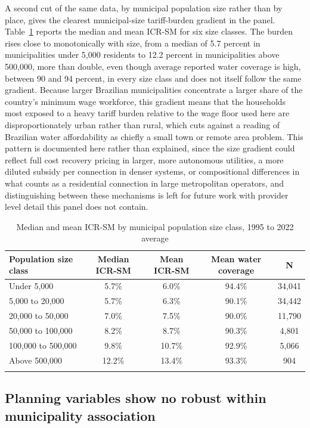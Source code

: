 \documentclass[pdflatex,sn-mathphys-num]{sn-jnl}%
\theoremstyle{thmstyleone}%
\theoremstyle{thmstyletwo}%
\theoremstyle{thmstylethree}%
\begin{document}
A second cut of the same data, by municipal population size rather than by place, gives the clearest municipal-size tariff-burden gradient in the panel. Table~\ref{tab_icr_porte} reports the median and mean ICR-SM for six size classes. The burden rises close to monotonically with size, from a median of 5.7 percent in municipalities under 5,000 residents to 12.2 percent in municipalities above 500,000, more than double, even though average reported water coverage is high, between 90 and 94 percent, in every size class and does not itself follow the same gradient. Because larger Brazilian municipalities concentrate a larger share of the country's minimum wage workforce, this gradient means that the households most exposed to a heavy tariff burden relative to the wage floor used here are disproportionately urban rather than rural, which cuts against a reading of Brazilian water affordability as chiefly a small town or remote area problem. This pattern is documented here rather than explained, since the size gradient could reflect full cost recovery pricing in larger, more autonomous utilities, a more diluted subsidy per connection in denser systems, or compositional differences in what counts as a residential connection in large metropolitan operators, and distinguishing between these mechanisms is left for future work with provider level detail this panel does not contain.

\begin{table}[h]
\caption{Median and mean ICR-SM by municipal population size class, 1995 to 2022 average}\label{tab_icr_porte}
\begin{tabular}{@{}lcccc@{}}
\toprule
Population size class & Median ICR-SM & Mean ICR-SM & Mean water coverage & N \\
\midrule
Under 5,000            & 5.7\% & 6.0\%  & 94.4\% & 34,041 \\
5,000 to 20,000        & 5.7\% & 6.3\%  & 90.1\% & 34,442 \\
20,000 to 50,000       & 7.0\% & 7.5\%  & 90.0\% & 11,790 \\
50,000 to 100,000      & 8.2\% & 8.7\%  & 90.3\% & 4,801 \\
100,000 to 500,000     & 9.8\% & 10.7\% & 92.9\% & 5,066 \\
Above 500,000          & 12.2\% & 13.4\% & 93.3\% & 904 \\
\botrule
\end{tabular}
\end{table}

\subsection{Planning variables show no robust within municipality association}\label{subsec_resultados2}
\end{document}
